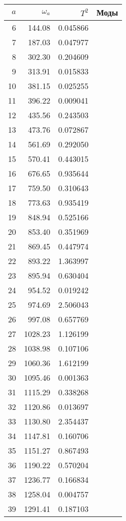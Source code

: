 \tiny
\begin{tabular}{r|rr|l}
  \toprule
  $a$ &  $\omega_a$ & $T^2$ & Моды \\
  \midrule
 6 &  144.08  &  0.045866  & \\
 7 &  187.03  &  0.047977  & \\
 8 &  302.30  &  0.204609  & \\
 9 &  313.91  &  0.015833  & \\
10 &  381.15  &  0.025255  & \\
11 &  396.22  &  0.009041  & \\
12 &  435.56  &  0.243503  & \\
13 &  473.76  &  0.072867  & \\
14 &  561.69  &  0.292050  & \\
15 &  570.41  &  0.443015  & \\
16 &  676.65  &  0.935644  & \\
17 &  759.50  &  0.310643  & \\
18 &  773.63  &  0.935419  & \\
19 &  848.94  &  0.525166  & \\
20 &  853.40  &  0.351969  & \\
21 &  869.45  &  0.447974  & \\
22 &  893.22  &  1.363997  & \\
23 &  895.94  &  0.630404  & \\
24 &  954.52  &  0.019242  & \\
25 &  974.69  &  2.506043  & \\
26 &  997.08  &  0.657769  & \\
27 & 1028.23  &  1.126199  & \\
28 & 1038.98  &  0.107106  & \\
29 & 1060.36  &  1.612199  & \\
30 & 1095.46  &  0.001363  & \\
31 & 1115.29  &  0.338268  & \\
32 & 1120.86  &  0.013697  & \\
33 & 1130.80  &  2.354437  & \\
34 & 1147.81  &  0.160706  & \\
35 & 1151.27  &  0.867493  & \\
36 & 1190.22  &  0.570204  & \\
37 & 1236.77  &  0.166834  & \\
38 & 1258.04  &  0.004757  & \\
39 & 1291.41  &  0.187103  & \\

\end{tabular}
